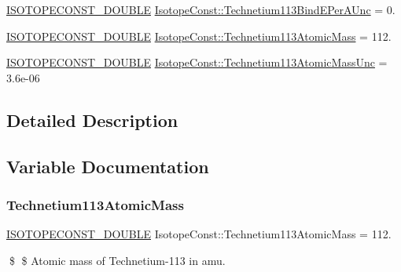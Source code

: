 \begin{DoxyCompactItemize}
\item 
\mbox{\hyperlink{group___isotope_const-_macros_ga8f45a7272ce02c0b4c65c44636ed719a}{I\+S\+O\+T\+O\+P\+E\+C\+O\+N\+S\+T\+\_\+\+D\+O\+U\+B\+LE}} \mbox{\hyperlink{group___isotope_const-_technetium-_tc113_gab89d995889be531af7d6c3fbe99bd4ac}{Isotope\+Const\+::\+Technetium113\+Bind\+E\+Per\+A\+Unc}} = 0.
\item 
\mbox{\hyperlink{group___isotope_const-_macros_ga8f45a7272ce02c0b4c65c44636ed719a}{I\+S\+O\+T\+O\+P\+E\+C\+O\+N\+S\+T\+\_\+\+D\+O\+U\+B\+LE}} \mbox{\hyperlink{group___isotope_const-_technetium-_tc113_ga9e66d4928f1a090947d8c8c1478a899c}{Isotope\+Const\+::\+Technetium113\+Atomic\+Mass}} = 112.
\item 
\mbox{\hyperlink{group___isotope_const-_macros_ga8f45a7272ce02c0b4c65c44636ed719a}{I\+S\+O\+T\+O\+P\+E\+C\+O\+N\+S\+T\+\_\+\+D\+O\+U\+B\+LE}} \mbox{\hyperlink{group___isotope_const-_technetium-_tc113_ga3f98cd16c7cbfcd68280146a504d9b9b}{Isotope\+Const\+::\+Technetium113\+Atomic\+Mass\+Unc}} = 3.\+6e-\/06
\end{DoxyCompactItemize}


\subsection{Detailed Description}


\subsection{Variable Documentation}
\mbox{\label{group___isotope_const-_technetium-_tc113_ga9e66d4928f1a090947d8c8c1478a899c}} 
\subsubsection{\texorpdfstring{Technetium113\+Atomic\+Mass}{Technetium113AtomicMass}}
{\footnotesize\ttfamily \mbox{\hyperlink{group___isotope_const-_macros_ga8f45a7272ce02c0b4c65c44636ed719a}{I\+S\+O\+T\+O\+P\+E\+C\+O\+N\+S\+T\+\_\+\+D\+O\+U\+B\+LE}} Isotope\+Const\+::\+Technetium113\+Atomic\+Mass = 112.}

\$ \$ Atomic mass of Technetium-\/113 in amu. \mbox{\label{group___isotope_const-_technetium-_tc113_ga3f98cd16c7cbfcd68280146a504d9b9b}} 
